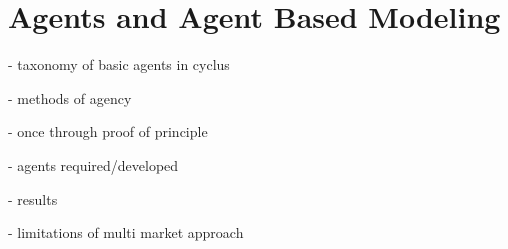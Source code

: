 
\section{Agents and Agent Based Modeling}\label{abm:abm}

- taxonomy of basic agents in cyclus

- methods of agency

- once through proof of principle

  - agents required/developed

  - results

- limitations of multi market approach
